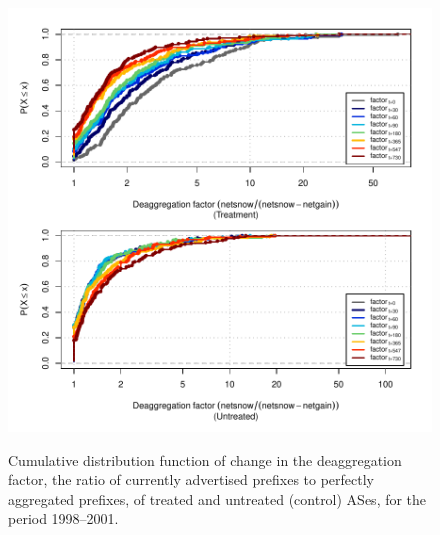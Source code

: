 \begin{figure}[H]
\begin{centering}
\begin{singlespace}
    \includegraphics[width=6in]{figures/behavior-deagg_factor-1998_2001-corr.pdf}
    \vspace{-2em}\\
    \caption{Cumulative distribution function of change in the deaggregation factor, the ratio of currently advertised prefixes to perfectly aggregated prefixes, of treated and untreated (control) ASes, for the period 1998--2001.}
\end{singlespace}
\end{centering}
\end{figure}
